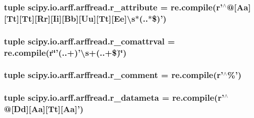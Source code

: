\subsubsection[{r\+\_\+attribute}]{\setlength{\rightskip}{0pt plus 5cm}tuple scipy.\+io.\+arff.\+arffread.\+r\+\_\+attribute = re.\+compile({\bf r}'$^\wedge$@\mbox{[}Aa\mbox{]}\mbox{[}Tt\mbox{]}\mbox{[}Tt\mbox{]}\mbox{[}Rr\mbox{]}\mbox{[}Ii\mbox{]}\mbox{[}Bb\mbox{]}\mbox{[}Uu\mbox{]}\mbox{[}Tt\mbox{]}\mbox{[}Ee\mbox{]}\textbackslash{}{\bf s}$\ast$(..$\ast$\$)')}\label{namespacescipy_1_1io_1_1arff_1_1arffread_a34d19b93bd6014c769088c1807e7ea77}
\hypertarget{namespacescipy_1_1io_1_1arff_1_1arffread_a526e0c0e3e4b0cafc430ab895c66507a}{}
\subsubsection[{r\+\_\+comattrval}]{\setlength{\rightskip}{0pt plus 5cm}tuple scipy.\+io.\+arff.\+arffread.\+r\+\_\+comattrval = re.\+compile({\bf r}\char`\"{}'(..+)'\textbackslash{}s+(..+\$)\char`\"{})}\label{namespacescipy_1_1io_1_1arff_1_1arffread_a526e0c0e3e4b0cafc430ab895c66507a}
\hypertarget{namespacescipy_1_1io_1_1arff_1_1arffread_a06cd4c0b17ad350443c4019558a73616}{}
\subsubsection[{r\+\_\+comment}]{\setlength{\rightskip}{0pt plus 5cm}tuple scipy.\+io.\+arff.\+arffread.\+r\+\_\+comment = re.\+compile({\bf r}'$^\wedge$\%')}\label{namespacescipy_1_1io_1_1arff_1_1arffread_a06cd4c0b17ad350443c4019558a73616}
\hypertarget{namespacescipy_1_1io_1_1arff_1_1arffread_a02e49a1d2f55d371a443c2d88223bcd0}{}
\subsubsection[{r\+\_\+datameta}]{\setlength{\rightskip}{0pt plus 5cm}tuple scipy.\+io.\+arff.\+arffread.\+r\+\_\+datameta = re.\+compile({\bf r}'$^\wedge$@\mbox{[}Dd\mbox{]}\mbox{[}Aa\mbox{]}\mbox{[}Tt\mbox{]}\mbox{[}Aa\mbox{]}')}\label{namespacescipy_1_1io_1_1arff_1_1arffread_a02e49a1d2f55d371a443c2d88223bcd0}
\hypertarget{namespacescipy_1_1io_1_1arff_1_1arffread_a7dde3e116c88d73a339c27b54cccdf23}{}
